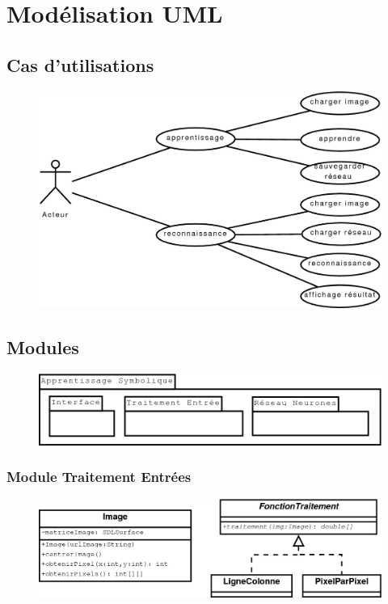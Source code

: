 \section{Mod\'elisation UML}

	\subsection{Cas d'utilisations}

\begin{figure}[H]
	\centering
	\includegraphics[width=0.8\linewidth]{diag/cas_utilisations.png}
\end{figure}

	\subsection{Modules}

\begin{figure}[H]
	\centering
	\includegraphics[width=0.8\linewidth]{diag/diag_package.png}
\end{figure}

	\subsubsection{Module Traitement Entr\'ees}

\begin{figure}[H]
	\centering
	\includegraphics[width=0.7\linewidth]{diag/class_image.png}
\end{figure}

